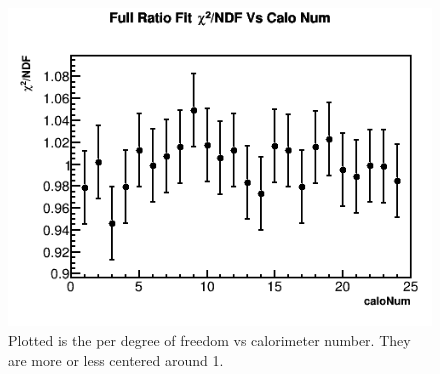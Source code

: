 	\begin{figure}[h]
		\centering
		\includegraphics[width=.7\textwidth]{RatioCBOFit_Chi2NDF_Vs_Calo_Canv}
	    \caption[RatioCBOFit_Chi2NDF_Vs_Calo_Canv]{Plotted is the \chisq per degree of freedom vs calorimeter number. They are more or less centered around 1.}
	    \label{fig:RatioCBOFit_Chi2NDF_Vs_Calo_Canv}
	\end{figure}


